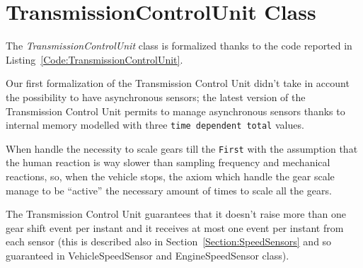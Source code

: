 \section{TransmissionControlUnit Class}
\label{Section:TransmissionControlUnit}
The \emph{TransmissionControlUnit} class is formalized thanks to the code reported in Listing~\ref{Code:TransmissionControlUnit}.

Our first formalization of the Transmission Control Unit didn't take in account the possibility to have asynchronous sensors; the latest version of the Transmission Control Unit permits to manage asynchronous sensors thanks to internal memory modelled with three \texttt{time dependent total} values.

When handle the necessity to scale gears till the \texttt{First} with the assumption that the human reaction is way slower than sampling frequency and mechanical reactions, so, when the vehicle stops, the axiom which handle the gear scale manage to be ``active'' the necessary amount of times to scale all the gears.

The Transmission Control Unit guarantees that it doesn't raise more than one gear shift event per instant and it receives at most one event per instant from each sensor (this is described also in Section~\ref{Section:SpeedSensors} and so guaranteed in VehicleSpeedSensor and EngineSpeedSensor class).


